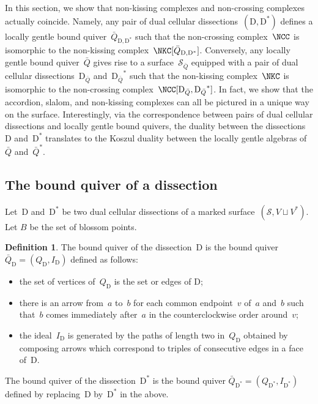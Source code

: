\documentclass{amsart}
\theoremstyle{definition}
\newtheorem{definition}[theorem]{Definition}
\newcommand{\surface}{\mathcal{S}} %
\newcommand{\dual}{^*} %
\newcommand{\dissection}{\mathrm{D}} %
\begin{document}
In this section, we show that non-kissing complexes and non-crossing complexes actually coincide.
Namely, any pair of dual cellular dissections~$(\dissection, \dissection\dual)$ defines a locally gentle bound quiver~$\bar Q_{\dissection, \dissection\dual}$ such that the non-crossing complex~$\NCC$ is isomorphic to the non-kissing complex~$\NKC[\bar Q_{\dissection, \dissection\dual}]$.
Conversely, any locally gentle bound quiver~$\bar Q$ gives rise to a surface~$\surface_{\bar Q}$ equipped with a pair of dual cellular dissections~$\dissection_{\bar Q}$ and~${\dissection_{\bar Q}}\dual$ such that the non-kissing complex~$\NKC$ is isomorphic to the non-crossing complex~$\NCC[\dissection_{\bar Q}, {\dissection_{\bar Q}}\dual]$.
In fact, we show that the accordion, slalom, and non-kissing complexes can all be pictured in a unique way on the surface.
Interestingly, via the correspondence between pairs of dual cellular dissections and locally gentle bound quivers, the duality between the dissections~$\dissection$ and~$\dissection\dual$ translates to the Koszul duality between the locally gentle algebras of~$\bar Q$ and~$\bar Q\dual$.

\subsection{The bound quiver of a dissection}

Let~$\dissection$ and~$\dissection\dual$ be two dual cellular dissections of a marked surface~$(\surface, V\sqcup V\dual)$.
Let $B$ be the set of blossom points.

\begin{definition}
\label{def:quiverDualDissections}
The bound quiver of the dissection~$\dissection$ is the bound quiver $\bar Q_{\dissection} = (Q_{\dissection}, I_{\dissection})$ defined as follows:
\begin{itemize}
 \item the set of vertices of~$Q_{\dissection}$ is the set or edges of $\dissection$;
 \item there is an arrow from~$a$ to~$b$ for each common endpoint~$v$ of~$a$ and~$b$ such that~$b$ comes immediately after~$a$ in the counterclockwise order around~$v$;
 \item the ideal~$I_{\dissection}$ is generated by the paths of length two in~$Q_{\dissection}$ obtained by composing arrows which correspond to triples of consecutive edges in a face of~$\dissection$.
\end{itemize}
The bound quiver of the dissection~$\dissection\dual$ is the bound quiver $\bar Q_{\dissection\dual} = (Q_{\dissection\dual}, I_{\dissection\dual})$ defined by replacing~$\dissection$ by~$\dissection\dual$ in the above.
\end{definition}
\end{document}
